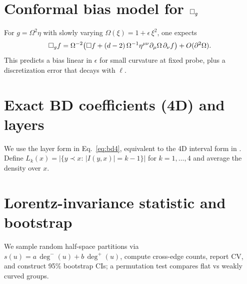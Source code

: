 \section{Conformal bias model for $\Box_g$}
For $g=\Omega^2\eta$ with slowly varying $\Omega(\xi)=1+\epsilon\,\xi^2$, one expects
\[
\Box_g f=\Omega^{-2}\!\left(\Box f +(d-2)\,\Omega^{-1}\eta^{\mu\nu}\partial_\mu\Omega\,\partial_\nu f\right)+O(\partial^2\Omega).
\]
This predicts a bias linear in $\epsilon$ for small curvature at fixed probe, plus a discretization error that decays with $\ell$.

\section{Exact BD coefficients (4D) and layers}
We use the layer form in Eq.~\eqref{eq:bd4}, equivalent to the 4D interval form in \citet{BenincasaDowker2010}. Define
$L_k(x)=|\{y\prec x:\,|I(y,x)|=k-1\}|$ for $k=1,\dots,4$ and average the density over $x$.

\section{Lorentz-invariance statistic and bootstrap}
We sample random half-space partitions via $s(u)=a\,\deg^{-}(u)+b\,\deg^{+}(u)$, compute cross-edge counts, report CV, and construct 95\% bootstrap CIs; a permutation test compares flat vs weakly curved groups.


